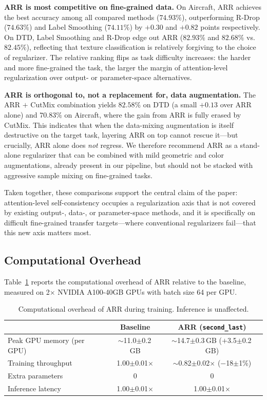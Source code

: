 \documentclass[review,12pt,authoryear]{elsarticle}
\newcommand{\std}[1]{{\scriptsize$\pm$#1}}
\newcommand{\method}{ARR}
\begin{document}
\textbf{\method{} is most competitive on fine-grained data.}
On Aircraft, \method{} achieves the best accuracy among all compared methods ($74.93\%$), outperforming R-Drop ($74.63\%$) and Label Smoothing ($74.11\%$) by $+0.30$ and $+0.82$ points respectively.
On DTD, Label Smoothing and R-Drop edge out \method{} ($82.93\%$ and $82.68\%$ vs.\ $82.45\%$), reflecting that texture classification is relatively forgiving to the choice of regularizer.
The relative ranking flips as task difficulty increases: the harder and more fine-grained the task, the larger the margin of attention-level regularization over output- or parameter-space alternatives.

\textbf{\method{} is orthogonal to, not a replacement for, data augmentation.}
The \method{} $+$ CutMix combination yields $82.58\%$ on DTD (a small $+0.13$ over \method{} alone) and $70.83\%$ on Aircraft, where the gain from \method{} is fully erased by CutMix.
This indicates that when the data-mixing augmentation is itself destructive on the target task, layering \method{} on top cannot rescue it---but crucially, \method{} alone does \emph{not} regress.
We therefore recommend \method{} as a stand-alone regularizer that can be combined with mild geometric and color augmentations, already present in our pipeline, but should not be stacked with aggressive sample mixing on fine-grained tasks.

Taken together, these comparisons support the central claim of the paper: attention-level self-consistency occupies a regularization axis that is not covered by existing output-, data-, or parameter-space methods, and it is specifically on difficult fine-grained transfer targets---where conventional regularizers fail---that this new axis matters most.

\subsection{Computational Overhead}
\label{sec:exp:overhead}

Table~\ref{tab:overhead} reports the computational overhead of \method{} relative to the baseline, measured on 2$\times$ NVIDIA A100-40GB GPUs with batch size 64 per GPU.

\begin{table}[t]
\centering
\caption{Computational overhead of \method{} during training. Inference is unaffected.}
\label{tab:overhead}
\small
\begin{tabular}{lcc}
\toprule
 & Baseline & \method{} (\texttt{second\_last}) \\
\midrule
Peak GPU memory (per GPU) & $\sim$11.0\std{0.2}\,GB & $\sim$14.7\std{0.3}\,GB ($+$3.5\std{0.2}\,GB) \\
Training throughput        & 1.00\std{0.01}$\times$ & $\sim$0.82\std{0.02}$\times$ ($-$18\std{1}\%) \\
Extra parameters           & 0 & 0 \\
Inference latency          & 1.00\std{0.01}$\times$ & 1.00\std{0.01}$\times$ \\
\bottomrule
\end{tabular}
\end{table}
\end{document}

